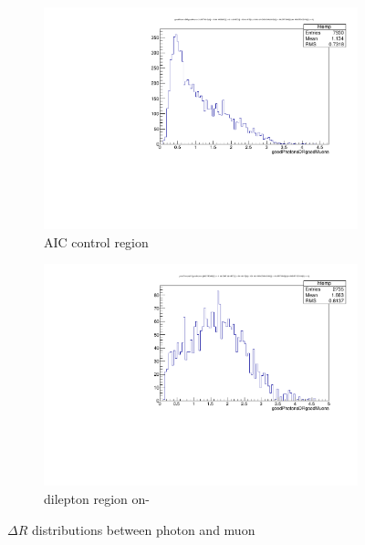 \begin{figure}
\begin{center}
	\begin{subfigure}[b]{.7\textwidth}
		\includegraphics[width=\textwidth]{Background/bkg_fakeLight/goodPhotonsDRgoodMuons_AIC}
		\caption{AIC control region}
	\end{subfigure}
	\begin{subfigure}[b]{.7\textwidth}
		\includegraphics[width=\textwidth]{Background/bkg_fakeLight/goodPhotonsDRgoodMuons_ONZ}
		\caption{dilepton region on-\Z}
	\end{subfigure}
	\caption{$\Delta R$ distributions between photon and muon 
	\label{fig:fakeLight_AIC_DR}}
\end{center}
\end{figure}

